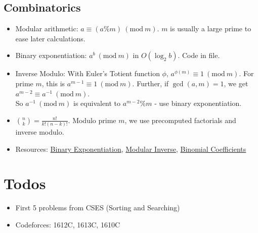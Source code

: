 \documentclass{article}
\newcommand{\Mod}[1]{\ (\mathrm{mod}\ #1)}
\begin{document}
\begin{sloppypar}
    \subsection{Combinatorics}
    \begin{itemize}
        \item Modular arithmetic: $a \equiv (a\%m) \Mod{m}$. $m$ is usually a large prime to ease later calculations.
        \item Binary exponentiation: $a^b \Mod{m}$ in $O(\log_2 b)$. Code in file.
        \item Inverse Modulo: With Euler's Totient function $\phi$, $a^{\phi(m)} \equiv 1 \Mod{m}$. For prime $m$, this is $a^{m-1} \equiv 1 \Mod{m}$. Further, if $\gcd{(a,m)} = 1$, we get $a^{m-2} \equiv a^{-1} \Mod{m}$.\\
        So $a^{-1} \Mod{m}$ is equivalent to $a^{m-2}\%m$ - use binary exponentiation.
        \item ${n \choose k} = \frac{n!}{k!(n-k)!}$. Modulo prime $m$, we use precomputed factorials and inverse modulo.
        \item Resources: \href{https://cp-algorithms.com/algebra/binary-exp.html}{Binary Exponentiation}, \href{https://cp-algorithms.com/algebra/module-inverse.html#definition}{Modular Inverse}, \href{https://cp-algorithms.com/combinatorics/binomial-coefficients.html#computing-binomial-coefficients-modulo-m}{Binomial Coefficients}
    \end{itemize}

    \section{Todos}
    \begin{itemize}
        \item First 5 problems from CSES (Sorting and Searching)
        \item Codeforces: 1612C, 1613C, 1610C
    \end{itemize}

\end{sloppypar}
\end{document}
